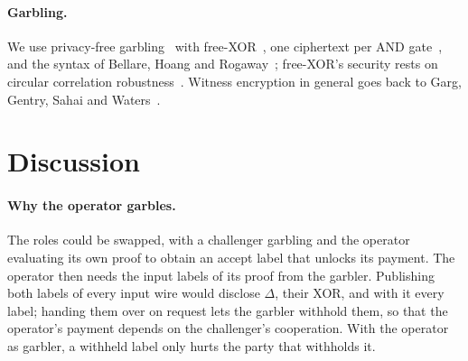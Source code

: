 \documentclass[11pt]{article}
\newcommand{\AND}{\textsf{AND}}
\begin{document}
\paragraph{Garbling.} We use privacy-free garbling~\cite{fno15privacyfree} with
free-XOR~\cite{ks08}, one ciphertext per \AND{} gate~\cite{zre15}, and the syntax
of Bellare, Hoang and Rogaway~\cite{bhr12foundations}; free-XOR's security rests on
circular correlation robustness~\cite{ckkz12freexor}. Witness encryption in general
goes back to Garg, Gentry, Sahai and Waters~\cite{ggsw13}.

\section{Discussion}\label{sec:discussion}

\paragraph{Why the operator garbles.} The roles could be swapped, with a
challenger garbling and the operator evaluating its own proof to obtain an accept
label that unlocks its payment. The operator then needs the input labels of its
proof from the garbler. Publishing both labels of every input wire would disclose
$\Delta$, their XOR, and with it every label; handing them over on request lets
the garbler withhold them, so that the operator's payment depends on the
challenger's cooperation. With the operator as garbler, a withheld label only
hurts the party that withholds it.
\end{document}

